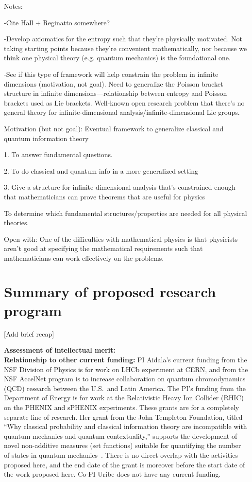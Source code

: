 Notes:

-Cite Hall + Reginatto somewhere?

-Develop axiomatics for the entropy such that they’re physically motivated.  Not taking starting points because they’re convenient mathematically, nor because we think one physical theory (e.g. quantum mechanics) is the foundational one.

-See if this type of framework will help constrain the problem in infinite dimensions (motivation, not goal).  Need to generalize the Poisson bracket structure in infinite dimensions—relationship between entropy and Poisson brackets used as Lie brackets.  Well-known open research problem that there’s no general theory for infinite-dimensional analysis/infinite-dimensional Lie groups.

Motivation (but not goal): Eventual framework to generalize classical and quantum information theory

1. To answer fundamental questions.

2. To do classical and quantum info in a more generalized setting

3. Give a structure for infinite-dimensional analysis that’s constrained enough that mathematicians can prove theorems that are useful for physics

To determine which fundamental structures/properties are needed for all physical theories.

Open with: One of the difficulties with mathematical physics is that physicists aren’t good at specifying the mathematical requirements such that mathematicians can work effectively on the problems.



\section{Summary of proposed research program}
[Add brief recap]

\noindent
\textbf{Assessment of intellectual merit:} \\

\noindent
\textbf{Relationship to other current funding:} PI Aidala's current funding from the NSF Division of Physics is for work on LHCb experiment at CERN, and from the NSF AccelNet program is to increase collaboration on quantum chromodynamics (QCD) research between the U.S.~and Latin America.  The PI's funding from the Department of Energy is for work at the Relativistic Heavy Ion Collider (RHIC) on the PHENIX and sPHENIX experiments.  These grants are for a completely separate line of research. Her grant from the John Templeton Foundation, titled ``Why classical probability and classical information theory are incompatible with quantum mechanics and quantum contextuality,'' supports the development of novel non-additive measures (set functions) suitable for quantifying the number of states in quantum mechanics~\cite{aop-nonaddmeas}.  There is no direct overlap with the activities proposed here, and the end date of the grant is moreover before the start date of the work proposed here.  Co-PI Uribe does not have any current funding. \\


